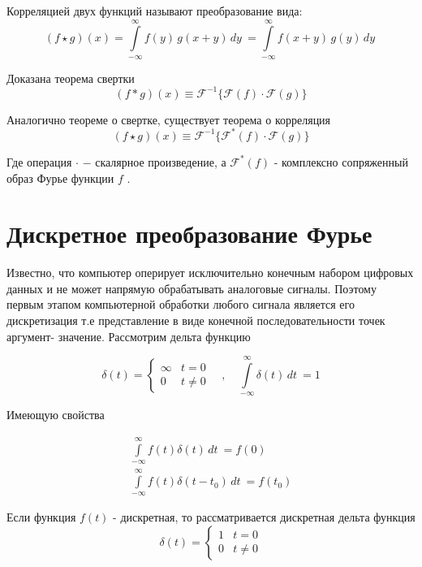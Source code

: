 \documentclass[oneside,final,14pt]{extreport}
\begin{document}
Корреляцией двух функций называют преобразование вида:
\begin{equation}
(f \star g)(x) 
= 
{\int\limits_{-\infty}^{\infty} f(y)\,g(x+y)\,dy~} 
= 
{\int\limits_{-\infty}^{\infty} f(x+y)\,g(y)\,dy~}  
\end{equation}

Доказана теорема свертки 
\begin{equation}
{(f*g)(x)}
\equiv
\mathcal{F}^{-1} \{
\mathcal{F}(f) \cdot \mathcal{F}(g) 
\}
\label{correlation_theorem}
\end{equation}

Аналогично теореме о свертке, существует теорема о корреляция 
\begin{equation}
{(f \star g)(x)} 
\equiv
\mathcal{F}^{-1} \{
\mathcal{F}^*(f) \cdot \mathcal{F}(g) 
\}
\end{equation}

Где операция \hspace{3pt} $\cdot$ \hspace{3pt} $-$ скалярное произведение, а $\mathcal{F}^*(f)$ - комплексно сопряженный образ Фурье функции $f$ .

\section{Дискретное преобразование Фурье}
Известно, что компьютер оперирует исключительно конечным набором цифровых данных и не может напрямую обрабатывать аналоговые сигналы. Поэтому первым этапом компьютерной обработки любого сигнала является его дискретизация т.е представление в виде конечной последовательности точек аргумент- значение.
Рассмотрим дельта функцию 

\begin{equation*}
\delta(t)=
\begin{cases}
\infty & t = 0 \\
0	 & t \neq 0
\end{cases}
\quad , \quad
{\int\limits_{-\infty}^{\infty}\delta(t)\,dt~}
=
1
\end{equation*}

Имеющую свойства

\begin{gather*}
{\int\limits_{-\infty}^{\infty}f(t)\delta(t)\,dt~}
=
f(0)
\\
{\int\limits_{-\infty}^{\infty}f(t)\delta(t-t_{0})\,dt~}
=
f(t_{0})
\end{gather*}

Если функция $f(t)$ - дискретная, то рассматривается дискретная дельта функция 
\begin{equation}
\delta(t)=
\begin{cases}
1 & t = 0 \\
0	 & t \neq 0
\end{cases}
\end{equation}
\end{document}
